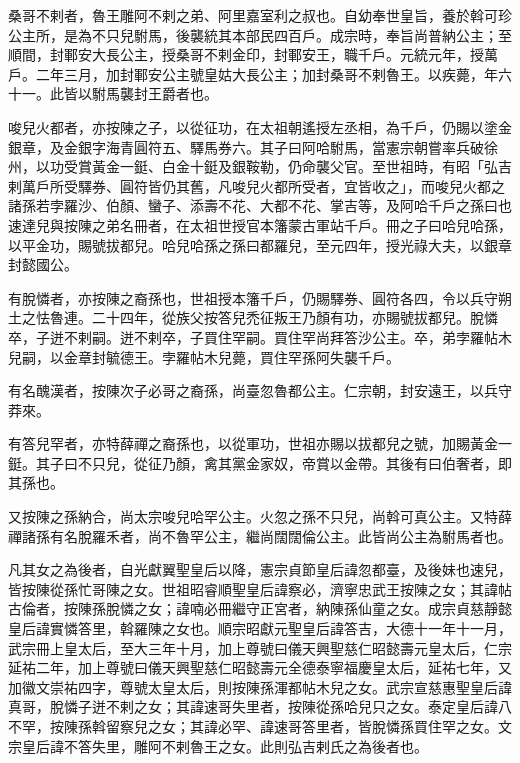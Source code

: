 \begin{pinyinscope}
 桑哥不剌者，魯王雕阿不剌之弟、阿里嘉室利之叔也。自幼奉世皇旨，養於斡可珍公主所，是為不只兒駙馬，後襲統其本部民四百戶。成宗時，奉旨尚普納公主；至順間，封鄆安大長公主，授桑哥不剌金印，封鄆安王，職千戶。元統元年，授萬戶。二年三月，加封鄆安公主號皇姑大長公主；加封桑哥不剌魯王。以疾薨，年六十一。此皆以駙馬襲封王爵者也。



 唆兒火都者，亦按陳之子，以從征功，在太祖朝遙授左丞相，為千戶，仍賜以塗金銀章，及金銀字海青圓符五、驛馬券六。其子曰阿哈駙馬，當憲宗朝嘗率兵破徐州，以功受賞黃金一鋌、白金十鋌及銀鞍勒，仍命襲父官。至世祖時，有昭「弘吉剌萬戶所受驛券、圓符皆仍其舊，凡唆兒火都所受者，宜皆收之」，而唆兒火都之諸孫若孛羅沙、伯顏、蠻子、添壽不花、大都不花、掌吉等，及阿哈千戶之孫曰也速達兒與按陳之弟名冊者，在太祖世授官本籓蒙古軍站千戶。冊之子曰哈兒哈孫，以平金功，賜號拔都兒。哈兒哈孫之孫曰都羅兒，至元四年，授光祿大夫，以銀章封懿國公。



 有脫憐者，亦按陳之裔孫也，世祖授本籓千戶，仍賜驛券、圓符各四，令以兵守朔土之怯魯連。二十四年，從族父按答兒禿征叛王乃顏有功，亦賜號拔都兒。脫憐卒，子迸不剌嗣。迸不剌卒，子買住罕嗣。買住罕尚拜答沙公主。卒，弟孛羅帖木兒嗣，以金章封毓德王。孛羅帖木兒薨，買住罕孫阿失襲千戶。



 有名醜漢者，按陳次子必哥之裔孫，尚臺忽魯都公主。仁宗朝，封安遠王，以兵守莽來。



 有答兒罕者，亦特薛禪之裔孫也，以從軍功，世祖亦賜以拔都兒之號，加賜黃金一鋌。其子曰不只兒，從征乃顏，禽其黨金家奴，帝賞以金帶。其後有曰伯奢者，即其孫也。



 又按陳之孫納合，尚太宗唆兒哈罕公主。火忽之孫不只兒，尚斡可真公主。又特薛禪諸孫有名脫羅禾者，尚不魯罕公主，繼尚闊闊倫公主。此皆尚公主為駙馬者也。



 凡其女之為後者，自光獻翼聖皇后以降，憲宗貞節皇后諱忽都臺，及後妹也速兒，皆按陳從孫忙哥陳之女。世祖昭睿順聖皇后諱察必，濟寧忠武王按陳之女；其諱帖古倫者，按陳孫脫憐之女；諱喃必冊繼守正宮者，納陳孫仙童之女。成宗貞慈靜懿皇后諱實憐答里，斡羅陳之女也。順宗昭獻元聖皇后諱答吉，大德十一年十一月，武宗冊上皇太后，至大三年十月，加上尊號曰儀天興聖慈仁昭懿壽元皇太后，仁宗延祐二年，加上尊號曰儀天興聖慈仁昭懿壽元全德泰寧福慶皇太后，延祐七年，又加徽文崇祐四字，尊號太皇太后，則按陳孫渾都帖木兒之女。武宗宣慈惠聖皇后諱真哥，脫憐子迸不剌之女；其諱速哥失里者，按陳從孫哈兒只之女。泰定皇后諱八不罕，按陳孫斡留察兒之女；其諱必罕、諱速哥答里者，皆脫憐孫買住罕之女。文宗皇后諱不答失里，雕阿不剌魯王之女。此則弘吉剌氏之為後者也。




\end{pinyinscope}
